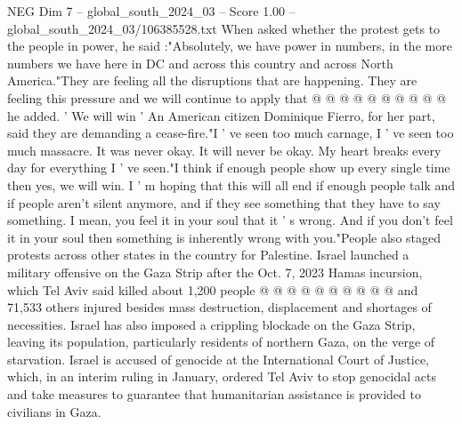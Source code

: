 \begin{textsample}{NEG Dim 7 – global\_south\_2024\_03 – Score 1.00 – global\_south\_2024\_03/106385528.txt}
When asked whether the protest gets to the people in power, he said :"Absolutely, we have power in numbers, in the more numbers we have here in DC and across this country and across North America."They are feeling all the disruptions that are happening.
They are feeling this pressure and we will continue to apply that @ @ @ @ @ @ @ @ @ @ he added. ' We will win ' An American citizen Dominique Fierro, for her part, said they are demanding a cease-fire."I ' ve seen too much carnage, I ' ve seen too much massacre.
It was never okay.
It will never be okay.
My heart breaks every day for everything I ' ve seen."I think if enough people show up every single time then yes, we will win.
I ' m hoping that this will all end if enough people talk and if people aren't silent anymore, and if they see something that they have to say something.
I mean, you feel it in your soul that it ' s wrong.
And if you don't feel it in your soul then something is inherently wrong with you."People also staged protests across other states in the country for Palestine.
Israel launched a military offensive on the Gaza Strip after the Oct. 7, 2023 Hamas incursion, which Tel Aviv said killed about 1,200 people @ @ @ @ @ @ @ @ @ @ and 71,533 others injured besides mass destruction, displacement and shortages of necessities.
Israel has also imposed a crippling blockade on the Gaza Strip, leaving its population, particularly residents of northern Gaza, on the verge of starvation.
Israel is accused of genocide at the International Court of Justice, which, in an interim ruling in January, ordered Tel Aviv to stop genocidal acts and take measures to guarantee that humanitarian assistance is provided to civilians in Gaza.

\end{textsample}
